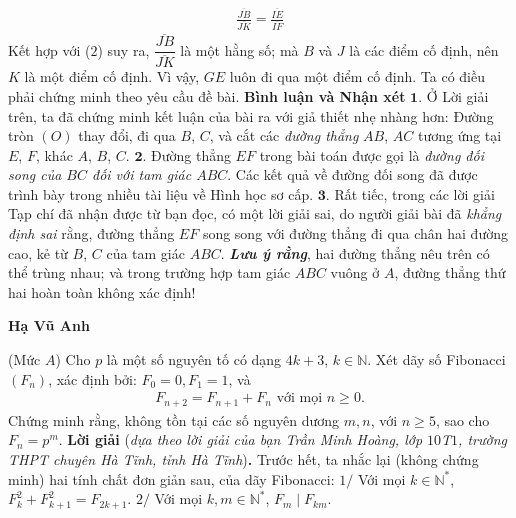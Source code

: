 \begin{multicols}{2}
	\begin{align*}
		\frac{{\overline {JB} }}{{\overline {JK} }} = \frac{{\overline {IE} }}{{\overline {IF} }}
	\end{align*}
	Kết hợp với ($2$) suy ra, $\dfrac{{\overline {JB} }}{{\overline {JK} }}$ là một hằng số; mà $B$ và $J$ là các điểm cố định, nên $K$ là một điểm cố định.
	\vskip 0.05cm
	Vì vậy, $GE$ luôn đi qua một điểm cố định. Ta có điều phải chứng minh theo yêu cầu đề bài.
	\vskip 0.05cm
	\textbf{\color{thachthuctoanhoc}Bình luận và Nhận xét}
	\vskip 0.05cm
	$\pmb{1.}$ Ở Lời giải trên, ta đã chứng minh kết luận của bài ra với giả thiết nhẹ nhàng hơn: Đường tròn $(O)$ thay đổi, đi qua $B$, $C$, và cắt các \textit{đường thẳng} $AB$, $AC$ tương ứng tại $E$, $F$, khác $A$, $B$, $C$.
	\vskip 0.05cm
	$\pmb{2.}$ Đường thẳng $EF$ trong bài toán được gọi là \textit{đường đối song của $BC$ đối với tam giác $ABC$}. Các kết quả về đường đối song đã được trình bày trong nhiều tài liệu về Hình học sơ cấp.
	\vskip 0.05cm
	$\pmb{3.}$ Rất tiếc, trong các lời giải Tạp chí đã nhận được từ bạn đọc, có một lời giải sai, do người giải bài đã \textit{khẳng định sai} rằng, đường thẳng $EF$ song song với đường thẳng đi qua chân hai đường cao, kẻ từ $B$, $C$ của tam giác $ABC$.
	\vskip 0.05cm
	\textbf{\color{thachthuctoanhoc}\textit{Lưu ý rằng}}, hai đường thẳng nêu trên có thể trùng nhau; và trong trường hợp tam giác $ABC$ vuông ở $A$, đường thẳng thứ hai hoàn toàn không xác định!
	\begin{flushright}
		\textbf{\color{thachthuctoanhoc}Hạ Vũ Anh}
	\end{flushright}
	{}
	(Mức $A$)
	Cho $p$ là một số nguyên tố có dạng $4k + 3$, $k \in \mathbb{N}$. Xét dãy số Fibonacci $(F_n)$, xác định bởi: $F_0 = 0, F_1 = 1$,    và
	\begin{align*}
		 {F_{n + 2}} = {F_{n + 1}} + {F_n}	\text{ với mọi } n \ge 0.
	\end{align*}
	Chứng minh rằng, không tồn tại các số nguyên dương $m, n$, với $n \ge 5$, sao cho \linebreak $F_n = p^m$.
	\vskip 0.05cm
	\textbf{\color{thachthuctoanhoc}Lời giải} (\textit{dựa theo lời giải của bạn Trần Minh Hoàng, lớp $10$T$1$, trường THPT chuyên Hà Tĩnh, tỉnh Hà Tĩnh})\textbf{\color{thachthuctoanhoc}.}
	\vskip 0.05cm
	Trước hết, ta nhắc lại (không chứng minh) hai tính chất đơn giản sau, của dãy Fibonacci:
	\vskip 0.05cm
	$1/$ Với mọi  $k \in \mathbb{N^*}$, $F_k^2 + F_{k + 1}^2 = {F_{2k + 1}}.$
	\vskip 0.05cm
	$2/$ Với mọi $k, m \in \mathbb{N^*}$, ${F_m}\mid{F_{km}}.$

\end{multicols}
